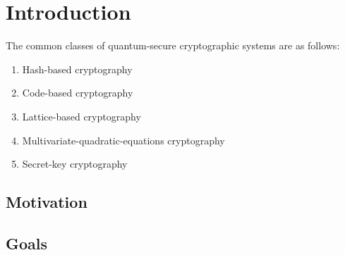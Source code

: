 \chapter{Introduction}
\label{cha:introduction}


The common classes of quantum-secure cryptographic systems are as follows:~\cite{book_pqc_bernstein_2004}
\begin{enumerate}
\item Hash-based cryptography
\item Code-based cryptography
\item Lattice-based cryptography
\item Multivariate-quadratic-equations cryptography
\item Secret-key cryptography
\end{enumerate}

\section{Motivation}

\section{Goals}


